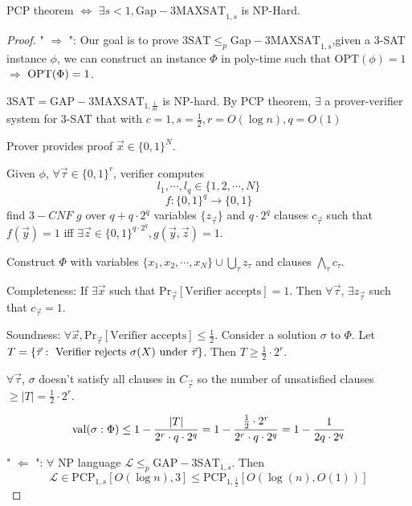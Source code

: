 \begin{proposition}
    PCP theorem  $ \Leftrightarrow $   $ \exists s<1,\mathrm{Gap-3MAXSAT}_{1,s} $ is NP-Hard.
\end{proposition}
\begin{proof}
    " $ \Rightarrow $ ": Our goal is to prove  $ \mathrm{3SAT} \leq_p \mathrm{Gap-3MAXSAT}_{1,s} $,\ie given a 3-SAT instance  $ \phi $, we can construct an instance $ \Phi $ in poly-time  such that  $ \mathrm{OPT}(\phi)=1 $ $ \Rightarrow  $  $ \mathrm{OPT}(\Phi)=1 $.
    
    $ \mathrm{3SAT}=\mathrm{GAP-3MAXSAT}_{1,\frac{1}{m}}$ is NP-hard. By PCP theorem,  $ \exists  $ a prover-verifier system for 3-SAT that with  $ c=1,s=\frac{1}{2},r=O(\log n),q=O(1) $ 
    
    Prover provides proof  $ \vec{x}\in \{0,1\}^N $.

    Given  $ \phi $,  $ \forall \vec{\tau}\in \{0,1\}^r $, verifier computes 
    \[l_1,\cdots,l_q\in \{1,2,\cdots,N\}\]
    \[f:\{0,1\}^q\rightarrow \{0,1\}\]
    find  $ 3-CNF $  $ g $ over  $ q+q\cdot 2^q $ variables $ \{z_{\vec{\tau}}\} $  and  $ q\cdot 2^q $ clauses $ c_{\vec{\tau}} $  such that  $ f(\vec{y})=1 $ iff  $ \exists \vec{z}\in \{0,1\}^{q\cdot 2^q},g(\vec{y},\vec{z})=1 $.       
    
    Construct  $ \Phi $ with variables  $ \{x_1,x_2,\cdots,x_N\}\cup \bigcup_\tau z_{\tau} $ and clauses  $\bigwedge_\tau c_{\tau} $.

    Completeness: If  $ \exists \vec{x} $  such that  $ \mathrm{Pr}_{\vec{\tau}}[\text{Verifier accepts}]=1 $. Then  $ \forall \vec{\tau}$,  $ \exists z_{\vec{\tau}} $ such that  $ c_{\vec{\tau}}=1 $.    

    Soundness:  $ \forall \vec{x},\mathrm{Pr}_{\vec{\tau}}[\text{Verifier accepts}] \leq \frac{1}{2} $. Consider a solution $ \sigma $  to  $ \Phi $.  Let  $ T=\{\vec{\tau}:\text{ Verifier rejects  $ \sigma(X) $ under  $ \vec{\tau} $}\} $. Then  $ T \geq \frac{1}{2}\cdot 2^r $.
    
    $ \forall \vec{\tau} $,  $ \sigma  $ doesn't satisfy all clauses in  $ C_{\vec{\tau}} $ so the number of unsatisfied clauses  $  \geq |T|=\frac{1}{2}\cdot 2^r $.
    
    \[\mathrm{val}(\sigma:\Phi) \leq 1-\frac{|T|}{2^r\cdot q\cdot 2^q}=1-\frac{\frac{1}{2}\cdot 2^r}{2^r\cdot q\cdot 2^q}=1-\frac{1}{2q\cdot 2^q}\]

    " $ \Leftarrow $ ":  $ \forall  $ NP language  $ \mathcal{L} \leq_p \mathrm{GAP-3SAT}_{1,s}$. Then 
    \[\mathcal{L}\in \mathrm{PCP}_{1,s}[O(\log n),3] \leq \mathrm{PCP}_{1,\frac{1}{2}}[O(\log (n),O(1))]\] 
\end{proof}
